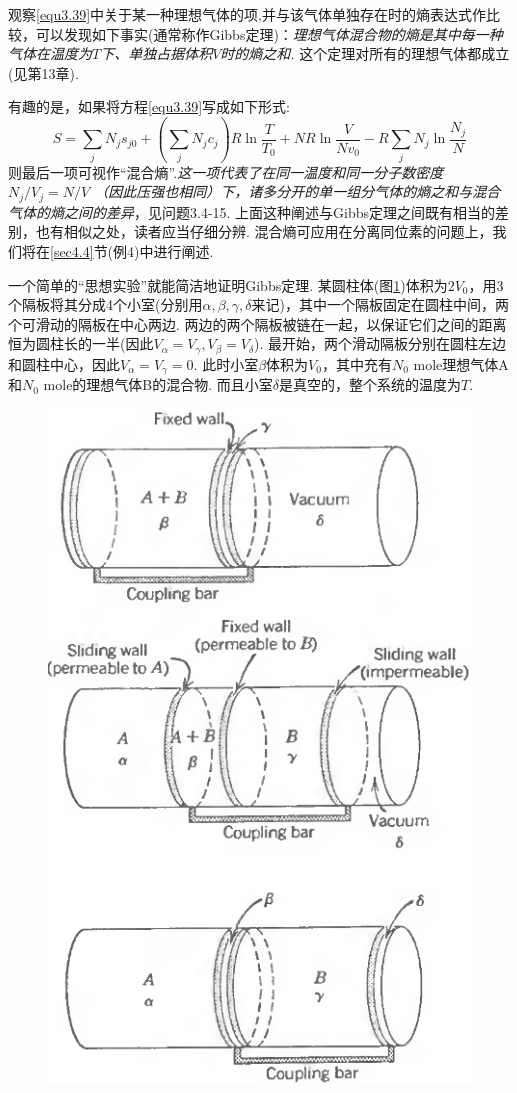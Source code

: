 观察\eqref{equ3.39}中关于某一种理想气体的项,并与该气体单独存在时的熵表达式作比较，可以发现如下事实(通常称作Gibbs定理)：{\it 理想气体混合物的熵是其中每一种气体在温度为$T$下、单独占据体积$V$时的熵之和. }这个定理对所有的理想气体都成立(见第13章).

有趣的是，如果将方程\eqref{equ3.39}写成如下形式:
\begin{equation}
\label{equ3.40}
S=\sum_jN_js_{j0}+\left(\sum_jN_jc_{j}\right)R\ln{\frac{T}{T_0}}+NR\ln{\frac{V}{Nv_0}}-R\sum_jN_j\ln{\frac{N_j}{N}}
\end{equation}
则最后一项可视作“混合熵”.{\it 这一项代表了在同一温度和同一分子数密度$N_j/V_j = N/V$ （因此压强也相同）下，诸多分开的单一组分气体的熵之和与混合气体的熵之间的差异}，见问题3.4-15. 上面这种阐述与Gibbs定理之间既有相当的差别，也有相似之处，读者应当仔细分辨. 混合熵可应用在分离同位素的问题上，我们将在\ref{sec4.4}节(例4)中进行阐述.

一个简单的“思想实验”就能简洁地证明Gibbs定理. 某圆柱体(图\ref{fig3.2})体积为$2V_0$，用3个隔板将其分成4个小室(分别用$\alpha,\beta,\gamma,\delta$来记)，其中一个隔板固定在圆柱中间，两个可滑动的隔板在中心两边. 两边的两个隔板被链在一起，以保证它们之间的距离恒为圆柱长的一半(因此$V_\alpha=V_\gamma, V_\beta=V_\delta$). 最开始，两个滑动隔板分别在圆柱左边和圆柱中心，因此$V_\alpha=V_\gamma=0$. 此时小室$\beta$体积为$V_0$，其中充有$N_0$  mole理想气体A和$N_0$ mole的理想气体B的混合物. 而且小室$\delta$是真空的，整个系统的温度为$T$.

\begin{figure}
\centering
\includegraphics[width=.5\textwidth]{Pictures/fig3.2.png}
\label{fig3.2}
\end{figure}

